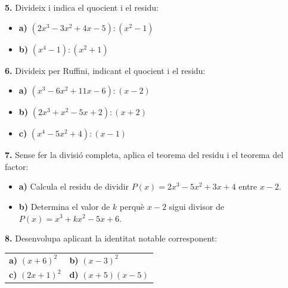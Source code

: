 \documentclass[13pt,a4paper]{extarticle}
\begin{document}
\par\noindent\begin{minipage}{\linewidth}
\textbf{5.} Divideix i indica el quocient i el residu:\par

\begin{itemize}[leftmargin=0pt,itemsep=3pt,topsep=3pt,parsep=0pt,label={}]
\item \textbf{a)} $(2x^3-3x^2+4x-5):(x^2-1)$
\item \textbf{b)} $(x^4-1):(x^2+1)$
\end{itemize}
\end{minipage}\par\vspace{1.6mm}
\par\noindent\begin{minipage}{\linewidth}
\textbf{6.} Divideix per Ruffini, indicant el quocient i el residu:\par

\begin{itemize}[leftmargin=0pt,itemsep=3pt,topsep=3pt,parsep=0pt,label={}]
\item \textbf{a)} $(x^3-6x^2+11x-6):(x-2)$
\item \textbf{b)} $(2x^3+x^2-5x+2):(x+2)$
\item \textbf{c)} $(x^4-5x^2+4):(x-1)$
\end{itemize}
\end{minipage}\par\vspace{1.6mm}
\par\noindent\begin{minipage}{\linewidth}
\textbf{7.} Sense fer la divisió completa, aplica el teorema del residu i el teorema del factor:\par

\begin{itemize}[leftmargin=0pt,itemsep=3pt,topsep=3pt,parsep=0pt,label={}]
\item \textbf{a)} Calcula el residu de dividir $P(x)=2x^3-5x^2+3x+4$ entre $x-2$.
\item \textbf{b)} Determina el valor de $k$ perquè $x-2$ sigui divisor de $P(x)=x^3+kx^2-5x+6$.
\end{itemize}
\end{minipage}\par\vspace{1.6mm}
\par\noindent\begin{minipage}{\linewidth}
\textbf{8.} Desenvolupa aplicant la identitat notable corresponent:\par

\begin{tabular}{@{}p{.46\linewidth}p{.46\linewidth}@{}}
\textbf{a)} $(x+6)^2$ & \textbf{b)} $(x-3)^2$ \\[2pt]
\textbf{c)} $(2x+1)^2$ & \textbf{d)} $(x+5)(x-5)$ \\[2pt]
\end{tabular}\par
\end{minipage}\par\vspace{1.6mm}
\end{document}
